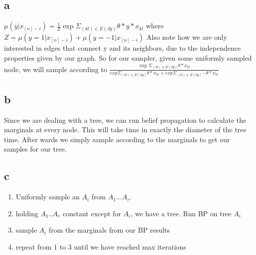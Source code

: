 \documentclass[12pt]{article}
\begin{document}
\begin{section}{8.2}
	\subsection{a}
	$\mu(y|x_{[n]-i}) = \frac{1}{Z}\exp\Sigma_{(kl)\in E(\partial y)}{\theta*y*x_{kl}}$ where 
	$Z =\mu(y=1|x_{[n]-i}) +  \mu(y=-1|x_{[n]-i})$ Also note how we are only interested in edges that connect y and its neighbors, due to the independence properties given by our graph. So for our sampler, given some uniformly sampled node, we will sample according to $\frac{\exp\Sigma_{(kl)\in E(\partial y)}{\theta*x_{kl}}}{exp\Sigma_{(kl)\in E(\partial y)}{\theta*x_{kl}}+exp\Sigma_{(kl)\in E(\partial y)}{-\theta*x_{kl}}}$
	\subsection{b}
	Since we are dealing with a tree, we can run belief propagation to calculate the marginals at every node. This will take time in exactly the diameter of the tree time. After wards we simply sample according to the marginals to get our samples for our tree.
	\subsection{c}
	\begin{enumerate}
		\item Uniformly sample an $A_i$ from $A_1...A_r$. 
		\item holding $A_1..A_r$ constant except for $A_i$, we have a tree. Run BP on tree $A_i$
		\item sample $A_i$ from the marginals from our BP results
		\item repeat from 1 to 3 until we have reached max iterations
	\end{enumerate}

\end{section}
\end{document}
